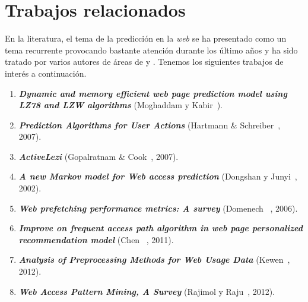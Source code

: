 \section{Trabajos relacionados}

En la literatura, el tema de la predicción en la \emph{web} se ha presentado como un tema recurrente provocando bastante atención durante los último años y ha sido tratado por varios autores de áreas de \machinelearning y \losslessdatacompression. Tenemos los siguientes trabajos de interés a continuación.

\vspace{1cm}


\begin{enumerate}

  \item \textbf{\emph{Dynamic and memory efficient web page prediction model using LZ78 and LZW algorithms}} (Moghaddam y Kabir~\cite{Moghaddam2009}). 


  \item \textbf{\emph{Prediction Algorithms for User Actions}} (Hartmann \& Schreiber~\cite{hartmann2007}, 2007). 
	
	
  \item \textbf{\emph{ActiveLezi}} (Gopalratnam  \& Cook~\cite{Gopalratnam2007}, 2007).  


  \item  \textbf{\emph{A new Markov model for Web access prediction}} (Dongshan y Junyi~\cite{Dongshan2002}, 2002). 
 
 
  \item \textbf{\emph{Web prefetching performance metrics: A survey}} (Domenech \etal~\cite{Domenech2006}, 2006). 
    
 
  \item \textbf{\emph{Improve on frequent access path algorithm in web page personalized recommendation model}} (Chen \etal~\cite{Chen2011}, 2011). 
  

  \item \textbf{\emph{Analysis of Preprocessing Methods for Web Usage Data}} (Kewen~\cite{kewen2012}, 2012). 


  \item \textbf{\emph{Web Access Pattern Mining, A Survey}} (Rajimol y Raju~\cite{Rajimol2012}, 2012). 
  


\end{enumerate}
